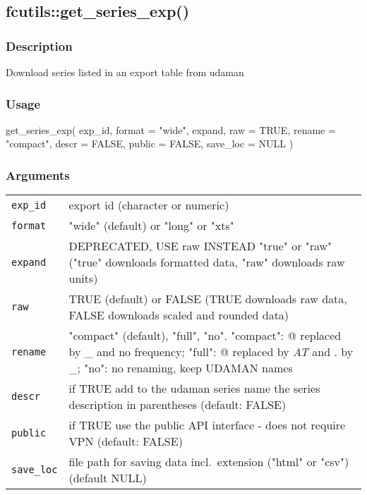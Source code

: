 \documentclass[
  letterpaper,
  DIV=11,
  numbers=noendperiod]{scrreport}
\newenvironment{Shaded}{\begin{snugshade}}{\end{snugshade}}
\newcommand{\AttributeTok}[1]{\textcolor[rgb]{0.40,0.45,0.13}{#1}}
\newcommand{\ConstantTok}[1]{\textcolor[rgb]{0.56,0.35,0.01}{#1}}
\newcommand{\FunctionTok}[1]{\textcolor[rgb]{0.28,0.35,0.67}{#1}}
\newcommand{\NormalTok}[1]{\textcolor[rgb]{0.00,0.23,0.31}{#1}}
\newcommand{\StringTok}[1]{\textcolor[rgb]{0.13,0.47,0.30}{#1}}
\begin{document}
\subsection{fcutils::get\_series\_exp()}\label{fcutilsget_series_exp}

\subsubsection{Description}\label{description-1}

Download series listed in an export table from udaman

\subsubsection{Usage}\label{usage-1}

\begin{Shaded}
\begin{Highlighting}[]
\FunctionTok{get\_series\_exp}\NormalTok{(}
\NormalTok{  exp\_id,}
  \AttributeTok{format =} \StringTok{"wide"}\NormalTok{,}
\NormalTok{  expand,}
  \AttributeTok{raw =} \ConstantTok{TRUE}\NormalTok{,}
  \AttributeTok{rename =} \StringTok{"compact"}\NormalTok{,}
  \AttributeTok{descr =} \ConstantTok{FALSE}\NormalTok{,}
  \AttributeTok{public =} \ConstantTok{FALSE}\NormalTok{,}
  \AttributeTok{save\_loc =} \ConstantTok{NULL}
\NormalTok{)}
\end{Highlighting}
\end{Shaded}

\subsubsection{Arguments}\label{arguments-1}

\begin{longtable}[]{@{}ll@{}}
\toprule\noalign{}
\endhead
\bottomrule\noalign{}
\endlastfoot
\texttt{exp\_id} & export id (character or numeric) \\
\texttt{format} & "wide" (default) or "long" or "xts" \\
\texttt{expand} & DEPRECATED, USE raw INSTEAD "true" or "raw" ("true"
downloads formatted data, "raw" downloads raw units) \\
\texttt{raw} & TRUE (default) or FALSE (TRUE downloads raw data, FALSE
downloads scaled and rounded data) \\
\texttt{rename} & "compact" (default), "full", "no". "compact": @
replaced by \_ and no frequency; "full": @ replaced by \emph{AT} and .
by \_; "no": no renaming, keep UDAMAN names \\
\texttt{descr} & if TRUE add to the udaman series name the series
description in parentheses (default: FALSE) \\
\texttt{public} & if TRUE use the public API interface - does not
require VPN (default: FALSE) \\
\texttt{save\_loc} & file path for saving data incl.~extension ("html"
or "csv") (default NULL) \\
\end{longtable}
\end{document}
